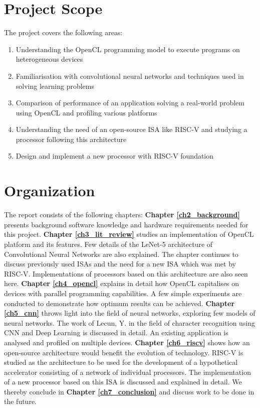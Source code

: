 \section{Project Scope}
\label{sect1_2}

The project covers the following areas:
\begin{enumerate}
\item Understanding the OpenCL programming model to execute programs on heterogeneous devices
\item Familiarisation with convolutional neural networks and  techniques used in solving learning problems
\item Comparison of performance of an application solving a real-world problem using OpenCL and profiling various platforms
\item Understanding the need of an open-source ISA like RISC-V and studying a processor following this architecture
\item Design and implement a new processor with RISC-V foundation
\end{enumerate}

\section{Organization}
\label{sect1_3}
The report consists of the following chapters: 
\textbf{Chapter \ref{ch2_background}} presents background software knowledge and hardware requirements needed for this project.
\textbf{Chapter \ref{ch3_lit_review}} studies an implementation of OpenCL platform and its features. Few details of the LeNet-5 architecture of Convolutional Neural Networks are also explained. The chapter continues to discuss previously used ISAs and the need for a new ISA which was met by RISC-V. Implementations of processors based on this architecture are also seen here.
\textbf{Chapter \ref{ch4_opencl}} explains in detail how OpenCL capitalises on devices with parallel programming capabilities. A few simple experiments are conducted to demonstrate how optimum results can be achieved. 
\textbf{Chapter \ref{ch5_cnn}} throws light into the field of neural networks, exploring few models of neural networks. The work of Lecun, Y. in the field of character recognition using \ac{CNN} and Deep Learning is discussed in detail. An existing application is analysed and profiled on multiple devices.
\textbf{Chapter \ref{ch6_riscv}} shows how an open-source architecture would benefit the evolution of technology. RISC-V is studied as the architecture to be used for the development of a hypothetical accelerator consisting of a network of individual processors. The implementation of a new processor based on this ISA is discussed and explained in detail. 
We thereby conclude in \textbf{Chapter \ref{ch7_conclusion}} and discuss work to be done in the future.